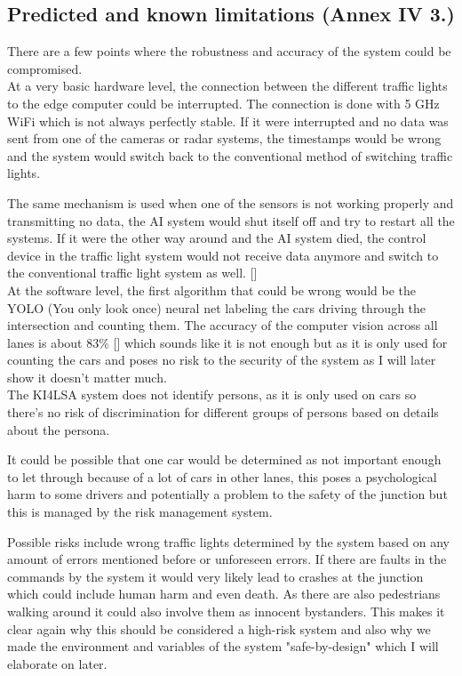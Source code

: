   \subsection{Predicted and known limitations (Annex IV 3.)}
  
There are a few points where the robustness and accuracy of the system could be compromised.\\
At a very basic hardware level, the connection between the different traffic lights to the edge computer could be interrupted. The connection is done with 5 GHz WiFi which is not always perfectly stable. If it were interrupted and no data was sent from one of the cameras or radar systems, the timestamps would be wrong and the system would switch back to the conventional method of switching traffic lights.

The same mechanism is used when one of the sensors is not working properly and transmitting no data, the AI system would shut itself off and try to restart all the systems. If it were the other way around and the AI system died, the control device in the traffic light system would not receive data anymore and switch to the conventional traffic light system as well. [\citet{KI4LSA_presentation}]\\
At the software level, the first algorithm that could be wrong would be the YOLO (You only look once) neural net labeling the cars driving through the intersection and counting them. The accuracy of the computer vision across all lanes is about 83\% [\citet{KI4LSA_presentation}] which sounds like it is not enough but as it is only used for counting the cars and poses no risk to the security of the system as I will later show it doesn't matter much.\\
The KI4LSA system does not identify persons, as it is only used on cars so there's no risk of discrimination for different groups of persons based on details about the persona.

It could be possible that one car would be determined as not important enough to let through because of a lot of cars in other lanes, this poses a psychological harm to some drivers and potentially a problem to the safety of the junction but this is managed by the risk management system.

Possible risks include wrong traffic lights determined by the system based on any amount of errors mentioned before or unforeseen errors.
If there are faults in the commands by the system it would very likely lead to crashes at the junction which could include human harm and even death. As there are also pedestrians walking around it could also involve them as innocent bystanders. This makes it clear again why this should be considered a high-risk system and also why we made the environment and variables of the system "safe-by-design" which I will elaborate on later.


